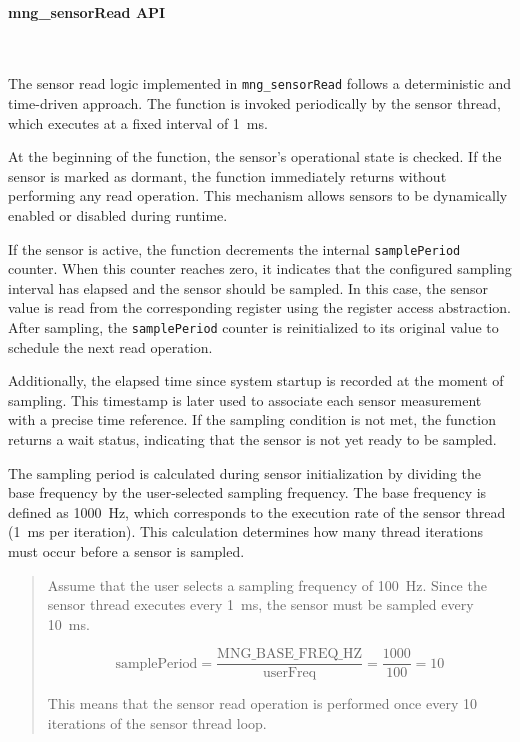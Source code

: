 \documentclass{article}
\begin{document}
\paragraph{mng\_sensorRead API}\

The sensor read logic implemented in \texttt{mng\_sensorRead} follows a deterministic 
and time-driven approach. The function is invoked periodically by the sensor thread, 
which executes at a fixed interval of 1~ms.

At the beginning of the function, the sensor’s operational state is checked. If the 
sensor is marked as dormant, the function immediately returns without performing any 
read operation. This mechanism allows sensors to be dynamically enabled or disabled 
during runtime.

If the sensor is active, the function decrements the internal \texttt{samplePeriod} 
counter. When this counter reaches zero, it indicates that the configured sampling 
interval has elapsed and the sensor should be sampled. In this case, the sensor value 
is read from the corresponding register using the register access abstraction. After 
sampling, the \texttt{samplePeriod} counter is reinitialized to its original value to 
schedule the next read operation.

Additionally, the elapsed time since system startup is recorded at the moment of 
sampling. This timestamp is later used to associate each sensor measurement with a 
precise time reference. If the sampling condition is not met, the function returns a 
wait status, indicating that the sensor is not yet ready to be sampled.

The sampling period is calculated during sensor initialization by dividing the base frequency by the user-selected sampling frequency. The base frequency is defined as 1000~Hz, which corresponds to the execution rate of the sensor thread (1~ms per iteration). This calculation determines how many thread iterations must occur before a sensor is sampled.

\begin{quote}
Assume that the user selects a sampling frequency of 100~Hz.  
Since the sensor thread executes every 1~ms, the sensor must be sampled every 10~ms.

\[
\text{samplePeriod} = \frac{\text{MNG\_BASE\_FREQ\_HZ}}{\text{userFreq}} =
\frac{1000}{100} = 10
\]

This means that the sensor read operation is performed once every 10 iterations of the sensor thread loop.
\end{quote}
\end{document}
